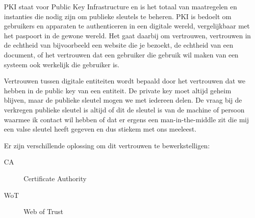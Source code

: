 PKI staat voor Public Key Infrastructure en is het totaal van maatregelen en instanties die nodig zijn om publieke sleutels te beheren. PKI is bedoelt om gebruikers en apparaten te authenticeren in een digitale wereld, vergelijkbaar met het paspoort in de gewone wereld. Het gaat daarbij om vertrouwen, vertrouwen in de echtheid van bijvoorbeeld een website die je bezoekt, de echtheid van een document, of het vertrouwen dat een gebruiker die gebruik wil maken van een systeem ook werkelijk die gebruiker is.

Vertrouwen tussen digitale entiteiten wordt bepaald door het vertrouwen dat we hebben in de public key van een entiteit. De private key moet altijd geheim blijven, maar de publieke sleutel mogen we met iedereen delen. De vraag bij de verkregen publieke sleutel is altijd of dit de sleutel is van de machine of persoon waarmee ik contact wil hebben of dat er ergens een man-in-the-middle zit die mij een valse sleutel heeft gegeven en dus stiekem met ons meeleest.

Er zijn verschillende oplossing om dit vertrouwen te bewerkstelligen:
\begin{description}
\item[CA] Certificate Authority
\item[WoT] Web of Trust
\end{description}
